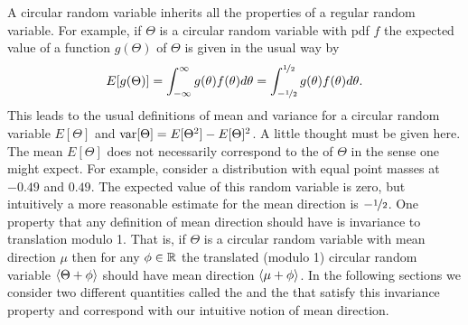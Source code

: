 \documentclass[journal]{../bib/IEEEtran}
\begin{document}
A circular random variable inherits all the properties of a regular random variable.  For example, if $\Theta$ is a circular random variable with pdf $f$ the expected value of a function $g(\Theta)$ of $\Theta$ is given in the usual way by
\[
E[g(\Theta)] = \int_{-\infty}^{\infty}g(\theta)f(\theta)d\theta = \int_{-\nicefrac{1}{2}}^{\nicefrac{1}{2}}g(\theta)f(\theta)d\theta.
\]
This leads to the usual definitions of mean and variance for a circular random variable $E[\Theta]$ and $\operatorname{var}[\Theta] = E[\Theta^2] - E[\Theta]^2$.  A little thought must be given here. The mean $E[\Theta]$ does not necessarily correspond to the  of $\Theta$ in the sense one might expect.  For example, consider a distribution with equal point masses at $-0.49$ and $0.49$.  The expected value of this random variable is zero, but intuitively a more reasonable estimate for the mean direction is $-\nicefrac{1}{2}$.  One property that any definition of mean direction should have is invariance to translation modulo 1.  That is, if $\Theta$ is a circular random variable with mean direction $\mu$ then for any $\phi \in {\mathbb R}$ the translated (modulo 1) circular random variable $\left< \Theta + \phi \right>$ should have mean direction $\left< \mu + \phi \right>$.  In the following sections we consider two different quantities called the  and the  that satisfy this invariance property and correspond with our intuitive notion of mean direction.


%
\end{document}

